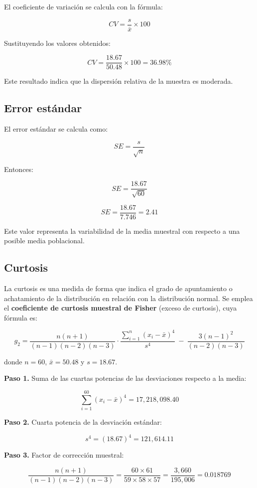 \documentclass[12pt,letterpaper]{article}
\begin{document}
El coeficiente de variación se calcula con la fórmula:

\[
CV=\frac{s}{\bar{x}}\times 100
\]

Sustituyendo los valores obtenidos:

\[
CV=\frac{18.67}{50.48}\times 100=36.98\%
\]

Este resultado indica que la dispersión relativa de la muestra es moderada.

\subsection{Error estándar}

El error estándar se calcula como:

\[
SE=\frac{s}{\sqrt{n}}
\]

Entonces:

\[
SE=\frac{18.67}{\sqrt{60}}
\]

\[
SE=\frac{18.67}{7.746}=2.41
\]

Este valor representa la variabilidad de la media muestral con respecto a una posible media poblacional.

\subsection{Curtosis}

La curtosis es una medida de forma que indica el grado de apuntamiento o achatamiento de la distribución en relación con la distribución normal. Se emplea el \textbf{coeficiente de curtosis muestral de Fisher} (exceso de curtosis), cuya fórmula es:

\[
g_2 = \frac{n(n+1)}{(n-1)(n-2)(n-3)}\cdot\frac{\displaystyle\sum_{i=1}^{n}(x_i-\bar{x})^4}{s^4}
     \ -\ \frac{3(n-1)^2}{(n-2)(n-3)}
\]

donde $n=60$, $\bar{x}=50.48$ y $s=18.67$.

\textbf{Paso 1.} Suma de las cuartas potencias de las desviaciones respecto a la media:

\[
\sum_{i=1}^{60}(x_i-\bar{x})^4 = 17{,}218{,}098.40
\]

\textbf{Paso 2.} Cuarta potencia de la desviación estándar:

\[
s^4 = (18.67)^4 = 121{,}614.11
\]

\textbf{Paso 3.} Factor de corrección muestral:

\[
\frac{n(n+1)}{(n-1)(n-2)(n-3)}
= \frac{60 \times 61}{59 \times 58 \times 57}
= \frac{3{,}660}{195{,}006}
= 0.018769
\]
\end{document}
